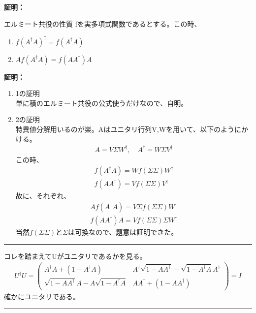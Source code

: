 \documentclass[a4paper,10.5pt]{article}
\numberwithin{equation}{section}
\newenvironment{proofbox}
{\begin{prooflabel}\textbf{証明：}\end{prooflabel}\vspace{0.8em}}
{\par\vspace{1em}\hrule\vspace{1em}}
\begin{document}
\begin{proofbox}
\begin{enumerate}
        \begin{resultbox}{エルミート共役の性質}
            fを実多項式関数であるとする。この時、
            \begin{enumerate}
                \item $f(A^{\dagger}A)^{\dagger}=f(A^{\dagger}A)$
                \item $Af(A^{\dagger}A)=f(AA^{\dagger})A$
            \end{enumerate}
        \end{resultbox}
        \begin{proofbox}
            \begin{enumerate}
                \item 1の証明\\
                単に積のエルミート共役の公式使うだけなので、自明。
                \item 2の証明\\
                特異値分解用いるのが楽。Aはユニタリ行列V,Wを用いて、以下のようにかける。
                \begin{align*}
                    A=V\Sigma W^{\dagger},\quad A^{\dagger}=W\Sigma V^{\dagger}
                \end{align*}
                この時、
                \begin{align*}
                    f(A^{\dagger}A)=Wf(\Sigma\Sigma)W^{\dagger}\\
                    f(AA^{\dagger})=Vf(\Sigma\Sigma)V^{\dagger}
                \end{align*}
                故に、それぞれ、
                \begin{align*}
                    Af(A^{\dagger}A)=V\Sigma f(\Sigma\Sigma)W^{\dagger}\\
                    f(AA^{\dagger})A=Vf(\Sigma\Sigma)\Sigma W^{\dagger}
                \end{align*}
                当然$f(\Sigma\Sigma)$と$\Sigma$は可換なので、題意は証明できた。
            \end{enumerate}
        \end{proofbox}
        コレを踏まえてUがユニタリであるかを見る。
        \begin{align*}
            U^{\dagger}U=\begin{pmatrix}
                A^{\dagger}A+(1-A^{\dagger}A)& A^{\dagger}\sqrt{1-AA^{\dagger}}-\sqrt{1-A^{\dagger}A}A^{\dagger}\\
                \sqrt{1-AA^{\dagger}}A-A\sqrt{1-A^{\dagger}A}& AA^{\dagger}+(1-AA^{\dagger})
            \end{pmatrix}
            =I
        \end{align*}
        確かにユニタリである。
    \end{enumerate}
\end{proofbox}
\end{document}
